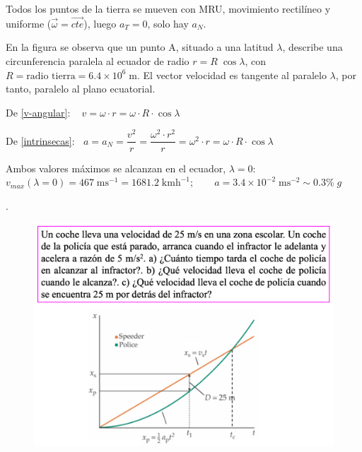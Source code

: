 Todos los puntos de la tierra se mueven con MRU, movimiento rectilíneo y uniforme ($\vec \omega =\overrightarrow{cte}$), luego $a_T=0$, solo hay $a_N$.

En la figura se observa que un punto A, situado a una latitud $\lambda$, describe una circunferencia paralela al ecuador de radio $r=R\; \cos \lambda$, con $R=\text{radio tierra}=6.4\times 10^6\; \mathrm{m}$.
El vector velocidad es tangente al paralelo $\lambda$, por tanto, paralelo al plano ecuatorial.

De  \ref{v-angular}: $\;\;\;v=\omega \cdot r =\omega\cdot R\cdot \cos \lambda$

De \ref{intrinsecas}: $\;\;a=a_N=\displaystyle \dfrac {v^2}r=\dfrac {\omega^2 \cdot r^2}r=\omega^2\cdot r=\omega\cdot R \cdot \cos \lambda$

Ambos valores máximos se alcanzan en el ecuador, $\lambda=0$:
$v_{max}(\lambda=0)=467 \;\mathrm{ms}^{-1}=1681.2\; \mathrm{kmh}^{-1}; \qquad a=3.4\times 10^{-2} \; \mathrm{ms}^{-2} \sim 0.3\%\; g$

\vspace{10mm} %
\begin{prob}.
	\begin{figure}[H]
		\centering
		\includegraphics[width=1\textwidth]{imagenes/imagenes02/T02IM25.png}
		\end{figure}
\end{prob}

